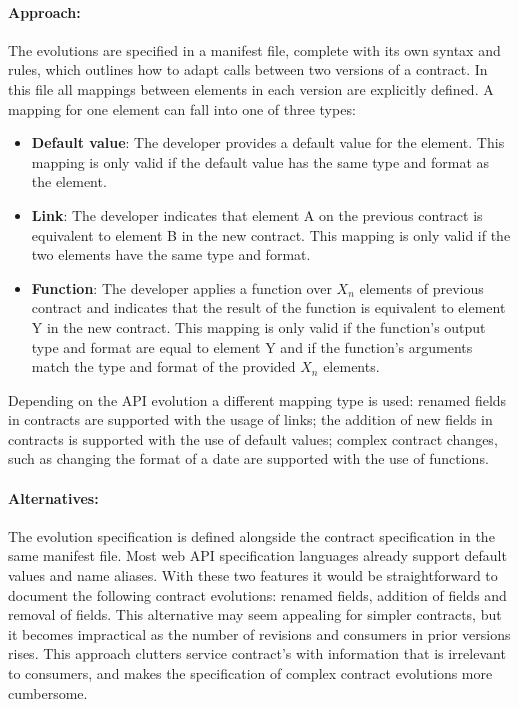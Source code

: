 \paragraph{Approach:}
The evolutions are specified in a manifest file, complete with its own syntax and rules,
which outlines how to adapt calls between two versions of a contract.
In this file all mappings between elements in each version are explicitly defined.
A mapping for one element can fall into one of three types:
\begin{itemize}
    \item \textbf{Default value}: The developer provides a default value for the element.
    This mapping is only valid if the default value has the same type and format as the element.
    \item \textbf{Link}: The developer indicates that element A on the previous contract is equivalent to element B in the new contract.
    This mapping is only valid if the two elements have the same type and format.
    \item \textbf{Function}: The developer applies a function over $X_{n}$ elements of previous contract and indicates that the result of the function is equivalent to element Y in the new contract.
    This mapping is only valid if the function's output type and format are equal to element Y and if the function's arguments match the type and format of the provided  $X_{n}$ elements.
\end{itemize}
Depending on the API evolution a different mapping type is used:
renamed fields in contracts are supported with the usage of links;
the addition of new fields in contracts is supported with the use of default values;
complex contract changes, such as changing the format of a date are supported with the use of functions.

\paragraph{Alternatives:}
The evolution specification is defined alongside the contract specification in the same manifest file.
Most web API specification languages already support default values and name aliases.
With these two features it would be straightforward
to document the following contract evolutions: renamed fields, addition of fields and removal of fields.
This alternative may seem appealing for simpler contracts, but it becomes impractical as the number of revisions and consumers in prior versions rises.
This approach clutters service contract's with information that is irrelevant to consumers, and makes the specification of complex contract evolutions more cumbersome.

